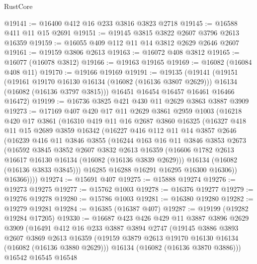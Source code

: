 \begin{lexlean}{RustCore}
\begin{coremodule}
@19141 := @16400 @412 @16 @233 @3816 @3823 @2718
@19145 := @16588 @411 @11 @15 @2691
@19151 := @19145 @3815 @3822 @2607 @3796 @2613 @16359
@19159 := @16055 @409 @112 @11 @14 @3812 @2629 @2646 @2607
@19161 := @19159 @3806 @2613
@19163 := @16072 @408 @3812
@19165 := @16077 (@16078 @3812)
@19166 := @19163 @19165
@19169 := @16082 (@16084 @408 @11)
@19170 := @19166 @19169
@19191 := @19135
    (@19141
      (@19151
        (@19161 @19170 @16130 @16134 (@16082 (@16136 @3807 @2629)))
        @16134
        (@16082 (@16136 @3797 @3815)))
      @16451
      @16454
      @16457
      @16461
      @16466
      @16472)
@19199 := @16736 @3825 @421 @430 @11 @2629 @3863 @3887 @3909
@19273 := @17169
    @407
    @420
    @17
    @11
    @2629
    @3861
    @2959
    @1003
    (@16218
      @420
      @17
      @3861
      (@16310
        @419
        @11
        @16
        @2687
        @3860
        @16325
        (@16327
          @418
          @11
          @15
          @2689
          @3859
          @16342
          (@16227
            @416
            @112
            @11
            @14
            @3857
            @2646
            (@16239
              @416
              @11
              @3846
              @3855
              (@16244
                @163
                @16
                @11
                @3846
                @3853
                @2673
                (@16592
                  @3845
                  @3852
                  @2607
                  @3832
                  @2613
                  @16359
                  (@16606 @1782 @2613 @16617 @16130 @16134 (@16082 (@16136 @3839 @2629)))
                  @16134
                  (@16082 (@16136 @3833 @3845)))
                @16285
                @16288
                @16291
                @16295
                @16300
                @16306))
            @16366))))
@19274 := @15691 @407
@19275 := @15888 @19274
@19276 := @19273 @19275
@19277 := @15762 @1003
@19278 := @16376 @19277
@19279 := @19276 @19278
@19280 := @15786 @1003
@19281 := @16380 @19280
@19282 := @19279 @19281
@19284 := @16385 (@16387 @407)
@19287 := @19199 (@19282 @19284 @17205)
@19330 := @16687
    @423
    @426
    @429
    @11
    @3887
    @3896
    @2629
    @3909
    (@16491
      @412
      @16
      @233
      @3887
      @3894
      @2747
      (@19145
        @3886
        @3893
        @2607
        @3869
        @2613
        @16359
        (@19159 @3879 @2613 @19170 @16130 @16134 (@16082 (@16136 @3880 @2629)))
        @16134
        (@16082 (@16136 @3870 @3886)))
      @16542
      @16545
      @16548

\end{coremodule}
\end{lexlean}
